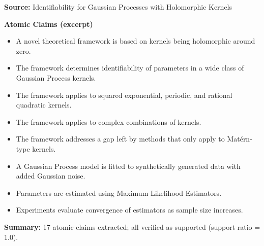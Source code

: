 \begin{tcolorbox}[title=\textbf{Example: Atomic Claims from Extracted Proposal}]
\small

\textbf{Source:} Identifiability for Gaussian Processes with Holomorphic Kernels

\vspace{0.3em}
\textbf{Atomic Claims (excerpt)}

\begin{itemize}
\item A novel theoretical framework is based on kernels being holomorphic around zero.
\item The framework determines identifiability of parameters in a wide class of Gaussian Process kernels.
\item The framework applies to squared exponential, periodic, and rational quadratic kernels.
\item The framework applies to complex combinations of kernels.
\item The framework addresses a gap left by methods that only apply to Matérn-type kernels.
\item A Gaussian Process model is fitted to synthetically generated data with added Gaussian noise.
\item Parameters are estimated using Maximum Likelihood Estimators.
\item Experiments evaluate convergence of estimators as sample size increases.
\end{itemize}

\vspace{0.3em}
\textbf{Summary:} 17 atomic claims extracted; all verified as supported (support ratio = 1.0).

\end{tcolorbox}